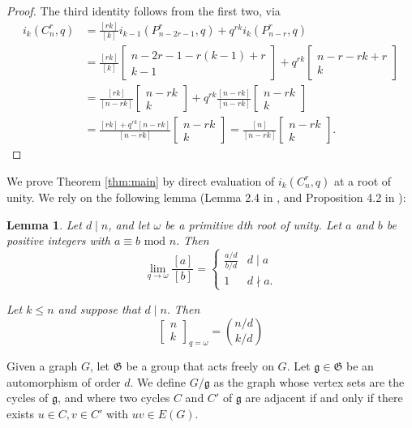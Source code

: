 \documentclass[12pt]{article}
\newtheorem{lemma}[theorem]{Lemma}
\theoremstyle{definition}
\newcommand{\gau}[2]{\left[ \begin{array}{c} #1 \\ #2 \end{array} \right]}
\begin{document}
\begin{proof}
The third identity follows from the first two, via
\begin{align*}
i_k(C_n^r, q) & =  \frac{[rk]}{[k]} i_{k-1}(P_{n-2r-1}^r,q)  +  q^{rk}i_k(P_{n-r}^r,q) \\
 & =  \frac{[rk]}{[k]}\gau{n-2r-1-r(k-1)+r}{k-1}  +  q^{rk}\gau{n-r-rk+r}{k} \\
& =  \frac{[rk]}{[n-rk]}\gau{n-rk}{k}  +  q^{rk}\frac{[n-rk]}{[n-rk]}\gau{n-rk}{k}  \\
 & =  \frac{[rk]+q^{rk}[n-rk]}{[n-rk]}\gau{n-rk}{k}  =   \frac{[n]}{[n-rk]}\gau{n-rk}{k}.
\end{align*}
\end{proof}


We prove Theorem \ref{thm:main} by direct evaluation of $i_k(C_n^r,q)$ at a root of unity. We rely on the following lemma (Lemma 2.4 in \cite{CSP2}, and Proposition 4.2 in \cite{CSP1}):
\begin{lemma}
    Let $d \mid n$, and let $\omega$ be a primitive $d$th root of unity. Let $a$ and $b$ be positive integers with $a \equiv b \mbox{ mod } n.$ Then \[\lim_{q \to \omega} \frac{[a]}{[b]} = \begin{cases} \frac{a/d}{b/d} & d \mid a \\ 1 & d \nmid a. \end{cases}\]

    Let $k \leq n$ and suppose that $d \mid n.$ Then \[\gau{n}{k}_{q=\omega} = \binom{n/d}{k/d}\]
    \label{lem:eval}
\end{lemma}

Given a graph $G$, let $\mathfrak{G}$ be a group that acts freely on $G$. Let $\mathfrak{g} \in \mathfrak{G}$ be an automorphism of order $d$. We define $G/\mathfrak{g}$ as the graph whose vertex sets are the cycles of $\mathfrak{g}$, and where two cycles $C$ and $C'$ of $\mathfrak{g}$ are adjacent if and only if there exists $u \in C, v \in C'$ with $uv \in E(G)$.
\end{document}
